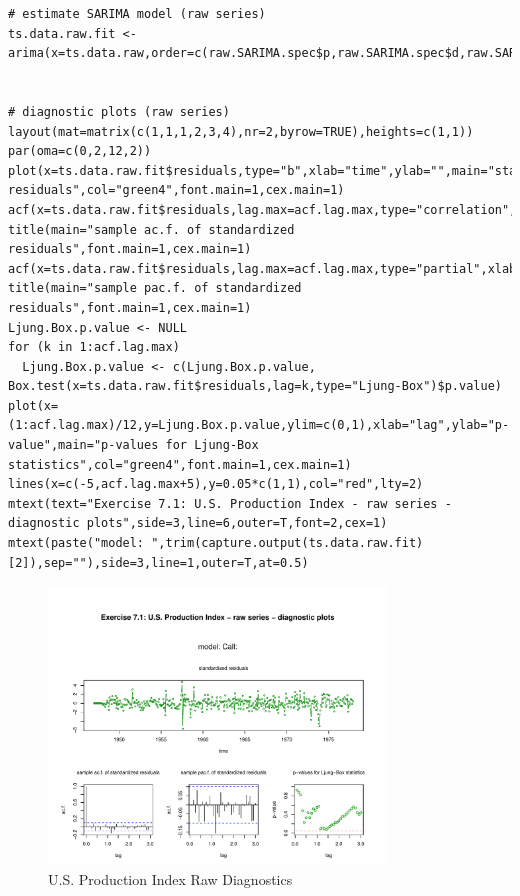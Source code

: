 \begin{lstlisting}
# estimate SARIMA model (raw series)
ts.data.raw.fit <- arima(x=ts.data.raw,order=c(raw.SARIMA.spec$p,raw.SARIMA.spec$d,raw.SARIMA.spec$q),seasonal=list(order=c(raw.SARIMA.spec$P,raw.SARIMA.spec$D,raw.SARIMA.spec$Q),period=raw.SARIMA.spec$freq))


# diagnostic plots (raw series)
layout(mat=matrix(c(1,1,1,2,3,4),nr=2,byrow=TRUE),heights=c(1,1))
par(oma=c(0,2,12,2))
plot(x=ts.data.raw.fit$residuals,type="b",xlab="time",ylab="",main="standardized residuals",col="green4",font.main=1,cex.main=1)
acf(x=ts.data.raw.fit$residuals,lag.max=acf.lag.max,type="correlation",xlab="lag",ylab="ac.f.",main="")
title(main="sample ac.f. of standardized residuals",font.main=1,cex.main=1)
acf(x=ts.data.raw.fit$residuals,lag.max=acf.lag.max,type="partial",xlab="lag",ylab="ac.f.",main="")
title(main="sample pac.f. of standardized residuals",font.main=1,cex.main=1)
Ljung.Box.p.value <- NULL
for (k in 1:acf.lag.max)
  Ljung.Box.p.value <- c(Ljung.Box.p.value, Box.test(x=ts.data.raw.fit$residuals,lag=k,type="Ljung-Box")$p.value)
plot(x=(1:acf.lag.max)/12,y=Ljung.Box.p.value,ylim=c(0,1),xlab="lag",ylab="p-value",main="p-values for Ljung-Box statistics",col="green4",font.main=1,cex.main=1)
lines(x=c(-5,acf.lag.max+5),y=0.05*c(1,1),col="red",lty=2)
mtext(text="Exercise 7.1: U.S. Production Index - raw series - diagnostic plots",side=3,line=6,outer=T,font=2,cex=1)
mtext(paste("model: ",trim(capture.output(ts.data.raw.fit)[2]),sep=""),side=3,line=1,outer=T,at=0.5)
\end{lstlisting}

\begin{figure}[H]
\centering
\includegraphics[width=0.8\textwidth]{plots/UsProdRawDiag.pdf}
\caption{U.S. Production Index Raw Diagnostics}
\end{figure}

